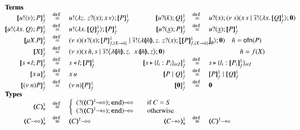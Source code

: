 \begin{figure}[h!]
\[
	\begin{array}{rclcrcl}
		\multicolumn{7}{l}{\textrm{\bf Terms}}
		\\
		\pmapp{\bout{u}{v} P}{1}{f}	&\defeq&	\bout{u}{ \abs{z}{\,\binp{z}{x} \appl{x}{v}} } \pmapp{P}{1}{f}
		& &
		\pmapp{\binp{u}{k} Q}{1}{f}	&\defeq&	\binp{u}{x} \newsp{s}{\appl{x}{s} \Par \bout{\dual{s}}{\abs{x}{\pmapp{Q}{1}{f}}} \inact}
		\\
		\pmapp{\bout{u}{\abs{x}{Q}} P}{1}{f} &\defeq& \bout{u}{\abs{x}{\pmapp{Q}{1}{f}}} \pmapp{P}{1}{f}
		& &
		\pmapp{\binp{u}{\underline{x}} P}{1}{f}	&\defeq&	\binp{u}{\underline{x}} \pmapp{P}{1}{f}
		\\
		\pmapp{\recp{X}{P}}{1}{f} &\defeq&
		\multicolumn{5}{l}{
			\newsp{s}{\binp{s}{x} \pmapp{P}{1}{{f,\{\varp{X}\to \tilde{n}\}}} \Par
			\bout{\dual{s}}{\abs{\vmap{\tilde{n}}, z } \,{\binp{z}{x} \auxmap{\pmapp{P}{1}{{f,\{\varp{X}\to \tilde{n}\}}}}{\es}}} \inact}
			\quad \tilde{n} = \ofn{P}
		}
		\\
		\pmapp{\varp{X}}{1}{f} &\defeq&
		\multicolumn{5}{l}{
			\newsp{s}{\appl{x}{\tilde{n}, s} \Par \bbout{\dual{s}}{ \abs{\vmap{\tilde{n}},z}\,\,{\appl{x}{ \vmap{\tilde{n}}, z}}} \inact}
			\qquad \qquad \qquad \qquad \qquad \quad \tilde{n} = f(\varp{X})
		}
		\\
		\pmapp{\bsel{s}{l} P}{1}{f}	&\defeq&	\bsel{s}{l} \pmapp{P}{1}{f}
		& & 
		\pmapp{\bbra{s}{l_i: P_i}_{i \in I}}{1}{f} &\defeq& \bbra{s}{l_i: \pmapp{P_i}{1}{f}}_{i \in I}
		\\
		\pmapp{\appl{x}{u}}{1}{f}	&\defeq&	\appl{x}{u}
		& &
		\pmapp{P \Par Q}{1}{f}		&\defeq&	\pmapp{P}{1}{f} \Par \pmapp{Q}{1}{f}
		\\
		\pmapp{\news{n} P}{1}{f}	&\defeq&	\news{n} \pmapp{P}{1}{f}
		& &
		\pmapp{\inact}{1}{f}		&\defeq&	\inact
		\\
		\multicolumn{7}{l}{\textrm{\bf Types}}
		\\
		\tmap{C}{1}_\mathsf{v}		&\defeq&
		\multicolumn{5}{l}{
			\left\{
			\begin{array}{rcl}
				\lhot{(\btinp{\lhot{\tmap{C}{1}}} \tinact)} && \textrm{if } C = S\\
				\lhot{(\btinp{\shot{\tmap{C}{1}}} \tinact)} && \textrm{otherwise}\\
			\end{array}
			\right.
		}
		\\
		\tmap{\lhot{C}}{1}_\mathsf{v}	&\defeq& \lhot{\tmap{C}{1}}
		& & 
		\tmap{\shot{C}}{1}_\mathsf{v}	&\defeq& \shot{\tmap{C}{1}}
		\\

\end{array}\]
\end{figure}
